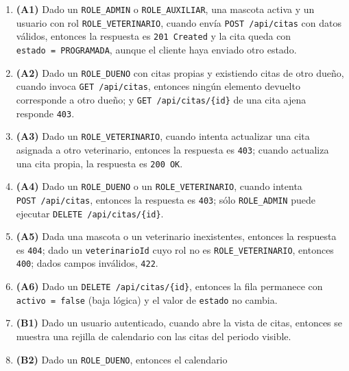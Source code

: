 \documentclass[
  spanish,
]{article}
\providecommand{\tightlist}{%
  \setlength{\itemsep}{0pt}\setlength{\parskip}{0pt}}
\begin{document}
\begin{itemize}
  \begin{enumerate}
  \def\labelenumi{\arabic{enumi}.}
  \tightlist
  \item
    \textbf{(A1)} Dado un \texttt{ROLE\_\allowbreak{}ADMIN} o
    \texttt{ROLE\_\allowbreak{}AUXILIAR}, una mascota activa y un usuario con rol
    \texttt{ROLE\_\allowbreak{}VETERINARIO}, cuando envía \texttt{POST\ /\allowbreak{}api/\allowbreak{}citas}
    con datos válidos, entonces la respuesta es \texttt{201\ Created} y
    la cita queda con \texttt{estado\ =\ PROGRAMAD\allowbreak{}A}, aunque el cliente
    haya enviado otro estado.
  \item
    \textbf{(A2)} Dado un \texttt{ROLE\_\allowbreak{}DUENO} con citas propias y
    existiendo citas de otro dueño, cuando invoca
    \texttt{GET\ /\allowbreak{}api/\allowbreak{}citas}, entonces ningún elemento devuelto
    corresponde a otro dueño; y \texttt{GET\ /\allowbreak{}api/\allowbreak{}citas/\allowbreak{}\{id\}} de una
    cita ajena responde \texttt{403}.
  \item
    \textbf{(A3)} Dado un \texttt{ROLE\_\allowbreak{}VETERINARIO}, cuando intenta
    actualizar una cita asignada a otro veterinario, entonces la
    respuesta es \texttt{403}; cuando actualiza una cita propia, la
    respuesta es \texttt{200\ OK}.
  \item
    \textbf{(A4)} Dado un \texttt{ROLE\_\allowbreak{}DUENO} o un
    \texttt{ROLE\_\allowbreak{}VETERINARIO}, cuando intenta
    \texttt{POST\ /\allowbreak{}api/\allowbreak{}citas}, entonces la respuesta es \texttt{403};
    sólo \texttt{ROLE\_\allowbreak{}ADMIN} puede ejecutar
    \texttt{DELETE\ /\allowbreak{}api/\allowbreak{}citas/\allowbreak{}\{id\}}.
  \item
    \textbf{(A5)} Dada una mascota o un veterinario inexistentes,
    entonces la respuesta es \texttt{404}; dado un
    \texttt{veterinario\allowbreak{}Id} cuyo rol no es \texttt{ROLE\_\allowbreak{}VETERINARIO},
    entonces \texttt{400}; dados campos inválidos, \texttt{422}.
  \item
    \textbf{(A6)} Dado un \texttt{DELETE\ /\allowbreak{}api/\allowbreak{}citas/\allowbreak{}\{id\}}, entonces
    la fila permanece con \texttt{activo\ =\ false} (baja lógica) y el
    valor de \texttt{estado} no cambia.
  \item
    \textbf{(B1)} Dado un usuario autenticado, cuando abre la vista de
    citas, entonces se muestra una rejilla de calendario con las citas
    del periodo visible.
  \item
    \textbf{(B2)} Dado un \texttt{ROLE\_\allowbreak{}DUENO}, entonces el calendario

\end{enumerate}
\end{itemize}
\end{document}
